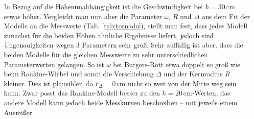 \documentclass[12pt,a4paper,headinclude,bibtotoc]{scrartcl}
\begin{document}
 In Bezug auf die Höhenunabhängigkeit ist die Geschwindigkeit bei $h=30\,$cm etwas höher.
 Vergleicht man nun aber die Parameter $\omega$, $R$ und $\Delta$ aus dem Fit der Modelle an die Messwerte (Tab. \ref{tab:tornado}), stellt man fest, dass jedes Modell zunächst für die beiden Höhen ähnliche Ergebnisse liefert, jedoch sind Ungenauigkeiten wegen 3 Parametern sehr groß.
Sehr auffällig ist aber, dass die beiden Modelle für die gleichen Messwerte zu sehr unterschiedlichen Parameterwerten gelangen.
So ist $\omega$ bei Burgers-Rott etwa doppelt so groß wie beim Rankine-Wirbel und somit die Verschiebung $\Delta$ und der Kernradius $R$ kleiner.
Dies ist plausibler, da $r_\Delta=0\,$cm nicht so weit von der Mitte weg sein kann.
Zwar passt das Rankine-Modell besser zu den $h=20\,$cm-Werten, das andere Modell kann jedoch beide Messkurven beschreiben -- mit jeweils einem Ausreißer.
 
\end{document}
